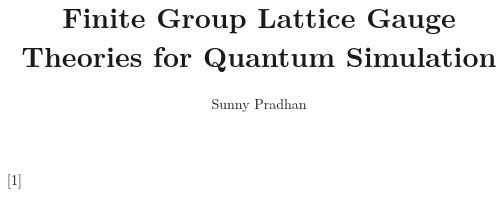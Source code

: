 \usepackage{wrapfig}


\usepackage[colorlinks, linkcolor=blue, urlcolor=Blue]{hyperref}
\usepackage{bookmark}
\usepackage{dirtytalk}

\title{Finite Group Lattice Gauge Theories for Quantum Simulation}
\author{Sunny Pradhan}
\date{}

\usepackage{xspace}
\newcommand{\dof}{d.o.f.\xspace}

\newcommand{\todo}[1]{\textcolor{red}{[ \textsf{#1} ]}}
\newcommand{\citneeded}{\textcolor{red}{\textsf{\textsuperscript{[citation?]}}}}


\usepackage[style=numeric, bibstyle=nature]{biblatex}


[1]{%
  }
